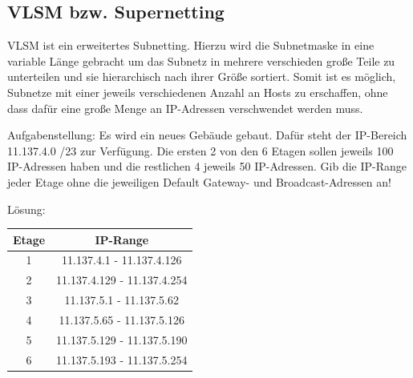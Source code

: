 \documentclass[12pt,a4paper]{article}
\begin{document}
		\subsection{VLSM bzw. Supernetting}
			VLSM ist ein erweitertes Subnetting. Hierzu wird die Subnetmaske in eine variable Länge gebracht um das Subnetz in mehrere verschieden große Teile zu unterteilen und sie hierarchisch nach ihrer Größe sortiert. Somit ist es möglich, Subnetze mit einer jeweils verschiedenen Anzahl an Hosts zu erschaffen, ohne dass dafür eine große Menge an IP-Adressen verschwendet werden muss.\vspace{.3cm}\newline
		\begin{minipage}[t]{.45\textwidth}
			Aufgabenstellung:
			\vspace{.2cm}\newline
			Es wird ein neues Gebäude gebaut. Dafür steht der IP-Bereich 11.137.4.0 /23 zur Verfügung. Die ersten 2 von den 6 Etagen sollen jeweils 100 IP-Adressen haben und die restlichen 4 jeweils 50 IP-Adressen. Gib die IP-Range jeder Etage ohne die jeweiligen Default Gateway- und Broadcast-Adressen an!
		\end{minipage}
		\hspace{1cm}
		\begin{minipage}[t]{.45\textwidth}
			Lösung:\vspace{.2cm}\newline
				\renewcommand{\arraystretch}{1.5}
				\begin{tabularx}{7.3cm}{|c|c|}
					\hline
					\cellcolor{cyan!60!white}Etage&\cellcolor{cyan!60!white}IP-Range \\
					\hline
					1&11.137.4.1   -  11.137.4.126 \\
					\hline
					2&11.137.4.129 -  11.137.4.254 \\
					\hline
					3&11.137.5.1   -  11.137.5.62 \\
					\hline
					4&11.137.5.65  -  11.137.5.126 \\
					\hline
					5&11.137.5.129 -  11.137.5.190 \\
					\hline
					6&11.137.5.193 -  11.137.5.254 \\
					\hline
				\end{tabularx}
		\end{minipage}
		
		\newpage
\end{document}
